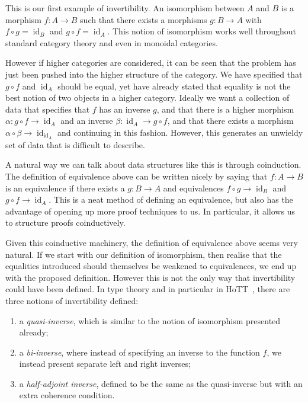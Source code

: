 \documentclass[draft]{article}
\theoremstyle{definition} \newtheorem{definition}{Definition}
\theoremstyle{remark} \newtheorem{remark}{Remark}
\DeclareMathOperator{\id}{id}
\begin{document}
This is our first example of invertibility. An isomorphism between
\(A\) and \(B\) is a morphism \(f : A \to B\) such that there exists a
morphisms \(g : B \to A\) with \(f \circ g = \id_B\) and \(g \circ f =
\id_A\). This notion of isomorphism works well throughout standard
category theory and even in monoidal categories.

However if higher categories are considered, it can be seen that the
problem has just been pushed into the higher structure of the
category. We have specified that \(g \circ f\) and \(\id_A\) should be
equal, yet have already stated that equality is not the best notion of
two objects in a higher category. Ideally we want a collection of data
that specifies that \(f\) has an inverse \(g\), and that there is a
higher morphism \(\alpha : g \circ f \to \id_A\) and an inverse
\(\beta : \id_A \to g \circ f\), and that there exists a morphism
\(\alpha \circ \beta \to \id_{\id_A}\) and continuing in this fashion.
However, this generates an unwieldy set of data that is difficult to
describe.

A natural way we can talk about data structures like this is through
coinduction. The definition of equivalence above can be written nicely
by saying that \(f : A \to B\) is an equivalence if there exists a \(g
: B \to A\) and equivalences \(f \circ g \to \id_B\) and \(g \circ f
\to \id_A\). This is a neat method of defining an equivalence, but
also has the advantage of opening up more proof techniques to us. In
particular, it allows us to structure proofs coinductively.

Given this coinductive machinery, the definition of equivalence above
seems very natural. If we start with our definition of isomorphism,
then realise that the equalities introduced should themselves be
weakened to equivalences, we end up with the proposed definition.
However this is not the only way that invertibility could have been
defined. In type theory and in particular in HoTT~\cite{hottbook},
there are three notions of invertibility defined:

\begin{enumerate}
\item a \emph{quasi-inverse}, which is similar to the notion of
  isomorphism presented already;
\item a \emph{bi-inverse}, where instead of specifying an inverse to
  the function \(f\), we instead present separate left and right
  inverses;
\item a \emph{half-adjoint inverse}, defined to be the same as the
  quasi-inverse but with an extra coherence condition.
\end{enumerate}
\end{document}
